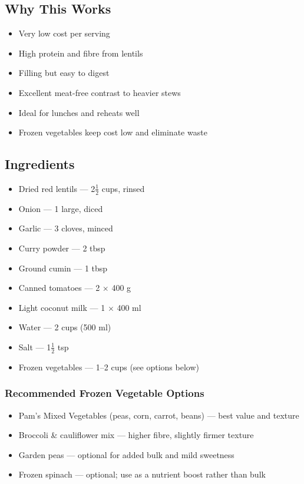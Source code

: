 \documentclass[11pt,a4paper]{article}
\begin{document}
\vspace{0.5em}

\subsection*{Why This Works}
\begin{itemize}
    \item Very low cost per serving
    \item High protein and fibre from lentils
    \item Filling but easy to digest
    \item Excellent meat-free contrast to heavier stews
    \item Ideal for lunches and reheats well
    \item Frozen vegetables keep cost low and eliminate waste
\end{itemize}

\vspace{0.5em}

\subsection*{Ingredients}
\begin{itemize}
    \item Dried red lentils — 2$\tfrac{1}{2}$ cups, rinsed
    \item Onion — 1 large, diced
    \item Garlic — 3 cloves, minced
    \item Curry powder — 2 tbsp
    \item Ground cumin — 1 tbsp
    \item Canned tomatoes — 2 $\times$ 400 g
    \item Light coconut milk — 1 $\times$ 400 ml
    \item Water — 2 cups (500 ml)
    \item Salt — 1$\tfrac{1}{2}$ tsp
    \item Frozen vegetables — 1--2 cups (see options below)
\end{itemize}

\vspace{0.5em}

\subsubsection*{Recommended Frozen Vegetable Options}
\begin{itemize}
    \item Pam's Mixed Vegetables (peas, corn, carrot, beans) — best value and texture
    \item Broccoli \& cauliflower mix — higher fibre, slightly firmer texture
    \item Garden peas — optional for added bulk and mild sweetness
    \item Frozen spinach — optional; use as a nutrient boost rather than bulk
\end{itemize}
\end{document}
